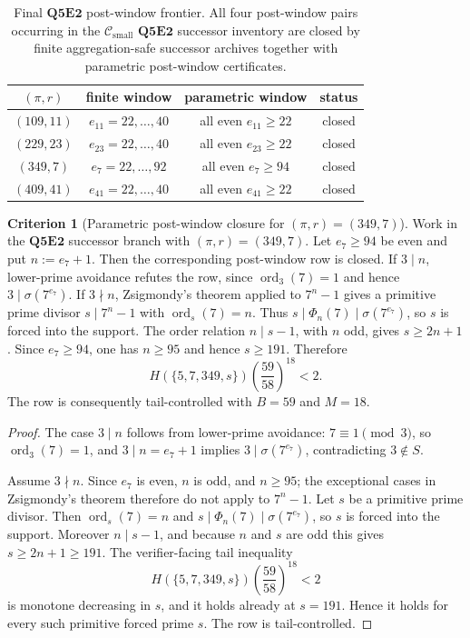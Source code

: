 \documentclass[11pt]{article}
\theoremstyle{definition}
\newtheorem{criterion}[theorem]{Criterion}
\theoremstyle{remark}
\newcommand{\Csmall}{\ensuremath{\mathcal C_{\mathrm{small}}}}
\begin{document}
\begin{table}[ht]
\centering
\small
\begin{tabular}{c|c|c|c}
\((\pi,r)\) & finite window & parametric window & status \\
\hline
\((109,11)\) &
\(e_{11}=22,\ldots,40\) &
all even \(e_{11}\ge22\) &
closed \\
\hline
\((229,23)\) &
\(e_{23}=22,\ldots,40\) &
all even \(e_{23}\ge22\) &
closed \\
\hline
\((349,7)\) &
\(e_7=22,\ldots,92\) &
all even \(e_7\ge94\) &
closed \\
\hline
\((409,41)\) &
\(e_{41}=22,\ldots,40\) &
all even \(e_{41}\ge22\) &
closed \\
\end{tabular}
\caption{Final \(\mathbf{Q5E2}\) post-window frontier.  All four
post-window pairs occurring in the \(\Csmall\) \(\mathbf{Q5E2}\) successor
inventory are closed by finite aggregation-safe successor archives together
with parametric post-window certificates.}
\label{tab:q5e2-final-post-window-frontier}
\end{table}
\FloatBarrier

\begin{criterion}[Parametric post-window closure for \((\pi,r)=(349,7)\)]
\label{crit:q5e2-pi349-r7-parametric-post-window}
Work in the \(\mathbf{Q5E2}\) successor branch with \((\pi,r)=(349,7)\).
Let \(e_7\ge94\) be even and put \(n:=e_7+1\).  Then the corresponding
post-window row is closed.  If \(3\mid n\), lower-prime avoidance refutes the
row, since \(\operatorname{ord}_3(7)=1\) and hence
\(3\mid\sigma(7^{e_7})\).  If \(3\nmid n\), Zsigmondy's theorem applied to
\(7^n-1\) gives a primitive prime divisor \(s\mid7^n-1\) with
\(\operatorname{ord}_s(7)=n\).  Thus
\(s\mid\Phi_n(7)\mid\sigma(7^{e_7})\), so \(s\) is forced into the support.
The order relation \(n\mid s-1\), with \(n\) odd, gives
\(s\ge2n+1\).  Since \(e_7\ge94\), one has \(n\ge95\) and hence \(s\ge191\).
Therefore
\[
  H(\{5,7,349,s\})
  \left(\frac{59}{58}\right)^{18}<2.
\]
The row is consequently tail-controlled with \(B=59\) and \(M=18\).
\end{criterion}

\begin{proof}
The case \(3\mid n\) follows from lower-prime avoidance: \(7\equiv1\pmod3\),
so \(\operatorname{ord}_3(7)=1\), and \(3\mid n=e_7+1\) implies
\(3\mid\sigma(7^{e_7})\), contradicting \(3\notin S\).

Assume \(3\nmid n\).  Since \(e_7\) is even, \(n\) is odd, and \(n\ge95\); the
exceptional cases in Zsigmondy's theorem therefore do not apply to \(7^n-1\).
Let \(s\) be a primitive prime divisor.  Then
\(\operatorname{ord}_s(7)=n\) and \(s\mid\Phi_n(7)\mid\sigma(7^{e_7})\), so
\(s\) is forced into the support.  Moreover \(n\mid s-1\), and because \(n\)
and \(s\) are odd this gives \(s\ge2n+1\ge191\).
The verifier-facing tail inequality
\[
  H(\{5,7,349,s\})
  \left(\frac{59}{58}\right)^{18}<2
\]
is monotone decreasing in \(s\), and it holds already at \(s=191\).  Hence it
holds for every such primitive forced prime \(s\).  The row is tail-controlled.
\end{proof}
\end{document}

